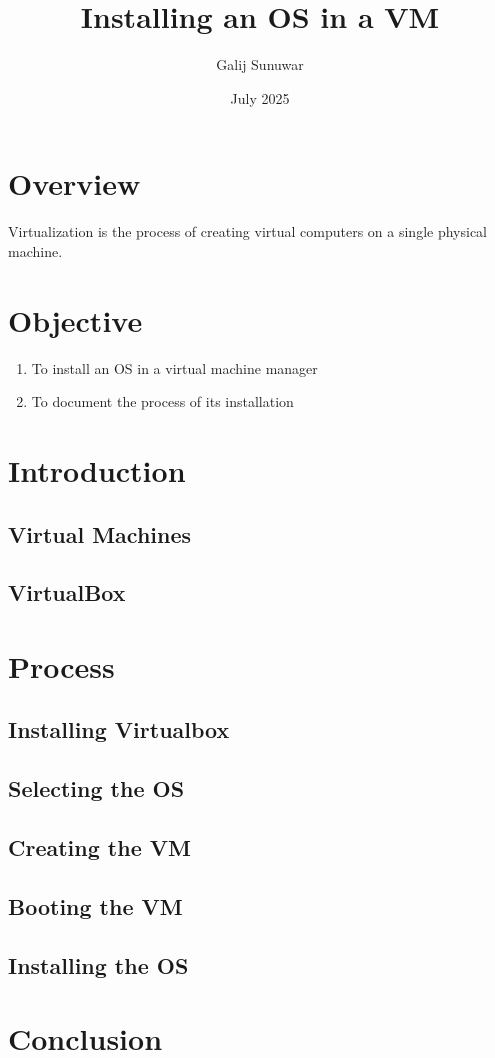 \documentclass[a4paper,12pt]{report}
\title{\textbf{Installing an OS in a VM}}
\author{Galij Sunuwar}
\date{July 2025}
\begin{document}
\maketitle

\section{Overview}
Virtualization is the process of creating virtual computers on a single physical machine. 


\section {Objective}
\begin{enumerate}
\item To install an OS in a virtual machine manager
\item To document the process of its installation
\end{enumerate}
\section{Introduction}
\subsection{Virtual Machines}
\subsection{VirtualBox}
\section{Process}
\subsection{Installing Virtualbox}
\subsection{Selecting the OS}
\subsection{Creating the VM}
\subsection{Booting the VM}
\subsection{Installing the OS}

\section{Conclusion}
\end{document}
